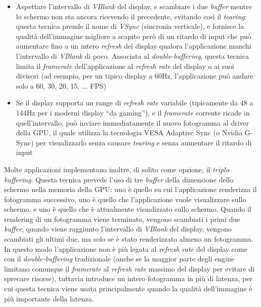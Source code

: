 \begin{itemize}
\begin{itemize}
		\item Aspettare l'intervallo di \textit{VBlank} del display, e scambiare i due \textit{buffer} mentre lo schermo non sta ancora ricevendo il precedente, evitando così il \textit{tearing}: questa tecnica prende il nome di \textit{VSync} (sincronia verticale), e fornisce la qualità dell'immagine migliore a scapito però di un ritardo di input che può aumentare fino a un intero \textit{refresh} del display qualora l'applicazione manchi l'intervallo di \textit{VBlank} di poco. Associata al \textit{double-buffering}, questa tecnica limita il \textit{framerate} dell'applicazione al \textit{refresh rate} del display o ai suoi divisori (ad esempio, per un tipico display a 60Hz, l'applicazione può andare solo a 60, 30, 20, 15, ... FPS)
		\item Se il display supporta un range di \textit{refresh rate} variabile (tipicamente da 48 a 144Hz per i moderni display ``da gaming''), e il \textit{framerate} corrente ricade in quell'intervallo, può inviare immediatamente il nuovo fotogramma al driver della GPU, il quale utilizza la tecnologia VESA Adaptive Sync (o Nvidia G-Sync) per visualizzarlo senza causare \textit{tearing} e senza aumentare il ritardo di input
	\end{itemize}
	Molte applicazioni implementano inoltre, di solito come opzione, il \textit{triplo buffering}. Questa tecnica prevede l'uso di tre \textit{buffer} della dimensione dello schermo nella memoria della GPU: uno è quello su cui l'applicazione renderizza il fotogramma successivo, uno è quello che l'applicazione vuole visualizzare sullo schermo, e uno è quello che è attualmente visualizzato sullo schermo. Quando il rendering di un fotogramma viene terminato, vengono scambiati i primi due \textit{buffer}, quando viene raggiunto l'intervallo di \textit{VBlank} del display, vengono scambiati gli ultimi due, ma solo se è stato renderizzato almeno un fotogramma. In questo modo l'applicazione non è più legata al \textit{refresh rate} del display come con il \textit{double-buffering} tradizionale (anche se la maggior parte degli engine limitano comunque il \textit{framerate} al \textit{refresh rate} massimo del display per evitare di sprecare risorse), tuttavia introduce un intero fotogramma in più di latenza, per cui questa tecnica viene usata principalmente quando la qualità dell'immagine è più importante della latenza.
\end{itemize}

